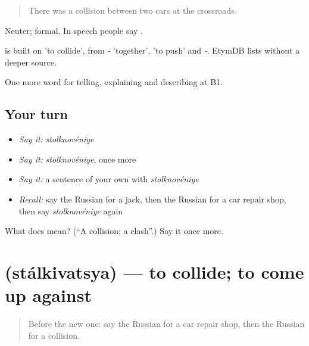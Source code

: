 \begin{quote}
There was a collision between two cars at the crossroads.
\end{quote}

Neuter; formal. In speech people say \emph{}.

\begin{cousinweb}
\emph{} is built on \emph{} 'to collide', from \emph{-} 'together', \emph{} 'to push' and \emph{-}. EtymDB lists \emph{} without a deeper source.
\end{cousinweb}

\begin{grammarlens}[title={What you've built}]
One more word for telling, explaining and describing at B1.
\end{grammarlens}

\subsection*{Your turn}
\begin{itemize}
\raggedright
  \item \emph{Say it:} \emph{stolknovéniye}
  \item \emph{Say it:} \emph{stolknovéniye}, once more
  \item \emph{Say it:} a sentence of your own with \emph{stolknovéniye}
  \item \emph{Recall:} say the Russian for a jack, then the Russian for a car repair shop, then say \emph{stolknovéniye} again
\end{itemize}

\begin{tcolorbox}[breakable,colback=teal!4,colframe=teal!35!black,title={Before you move on}]
What does  mean? (\textquotedblleft{}A collision; a clash\textquotedblright{}.) Say it once more.
\end{tcolorbox}
\section[\texorpdfstring{\ru{сталкиваться} (stálkivatsya)}{сталкиваться (stálkivatsya)}]{ (stálkivatsya) — to collide; to come up against}

\label{lesson:RU-C410-stalkivatsya}



\begin{quote}
Before the new one: say the Russian for a car repair shop, then the Russian for a collision.
\end{quote}

